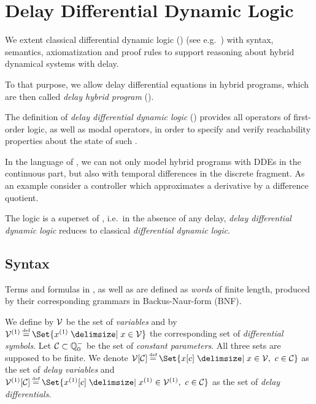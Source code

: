 \chapter{Delay Differential Dynamic Logic}
\label{ch:delay-differential-dynamic-logic}

We extent classical differential dynamic logic (\dL) (see e.g.~\cite{Platzer12LogicsDynSys}) with syntax, semantics, axiomatization and proof rules to support reasoning about hybrid dynamical systems with delay.

To that purpose, we allow delay differential equations in hybrid programs, which are then called \emph{delay hybrid program} (\dHP).

The definition of \emph{delay differential dynamic logic} (\ddL) provides all operators of first-order logic, as well as modal operators, in order to specify and verify reachability properties about the state of such \dHPs.

In the language of \ddL, we can not only model hybrid programs with DDEs in the continuous part, but also with temporal differences in the discrete fragment.
As an example consider a controller which approximates a derivative by a difference quotient.

The logic \ddL is a superset of \dL, i.e.\ in the absence of any delay, \emph{delay differential dynamic logic} reduces to classical \emph{differential dynamic logic}.



\section{Syntax}
    \label{sec:syntax}

    Terms and formulas in \ddL, as well as \dHPs are defined as \emph{words} of finite length, produced by their corresponding grammars in Backus-Naur-form (BNF).

    We define by $\mathcal{V}$ be the set of \emph{variables} and by $\diffvars\defeq\Set{\D{x} \with x\in\allvars}$ the corresponding set of \emph{differential symbols}.
    Let $\mathcal{C}_{}\subset\mathbb{Q}^-_0$ be the set of \emph{constant parameters}.
    All three sets are supposed to be finite.
    We denote $\delayvars\defeq\Set{\x[c] \with x\in\allvars,\ c\in\constants}$ as the set of \emph{delay variables} and $\delaydiffvars\defeq\Set{\Dx[c] \with \D{x}\in\diffvars,\ c\in\constants}$ as the set of \emph{delay differentials}.

